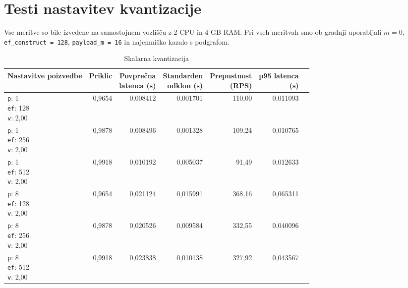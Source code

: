 \clearpage

\section{Testi nastavitev kvantizacije}

Vse meritve so bile izvedene na samostojnem vozlišču z 2 CPU in 4 GB RAM. Pri vseh meritvah smo ob gradnji uporabljali $m = 0$, \texttt{ef\_construct = 128}, \texttt{payload\_m = 16} in najemniško kazalo s podgrafom.

\begin{table}[htbp]
  \centering
\small
  \caption{Skalarna kvantizacija}
  \label{tab:single-2cpu-4ram:sq-2:qdrant-dipl-baseline-tenant-subgraph-sq-m16-ef-128-random-768-100-tenants-extended-upload-2026-08-18-08-20-34.json}
  \begin{tabularx}{\textwidth}{Xrrrrrr}
    \toprule
    Nastavitve poizvedbe & Priklic & \makecell{Povprečna\\latenca (s)} & \makecell{Standarden\\odklon (s)} & \makecell{Prepustnost\\(RPS)} & \makecell{p95 latenca\\(s)}  \\
    \midrule
    \makecell{\texttt{p}: 1\\\texttt{ef}: 128\\\texttt{v}: 2,00} & 0,9654 & 0,008412 & 0,001701 & 110,00 & 0,011093 \\
    \makecell{\texttt{p}: 1\\\texttt{ef}: 256\\\texttt{v}: 2,00} & 0,9878 & 0,008496 & 0,001328 & 109,24 & 0,010765 \\
    \makecell{\texttt{p}: 1\\\texttt{ef}: 512\\\texttt{v}: 2,00} & 0,9918 & 0,010192 & 0,005037 & 91,49 & 0,012633 \\
    \makecell{\texttt{p}: 8\\\texttt{ef}: 128\\\texttt{v}: 2,00} & 0,9654 & 0,021124 & 0,015991 & 368,16 & 0,065311 \\
    \makecell{\texttt{p}: 8\\\texttt{ef}: 256\\\texttt{v}: 2,00} & 0,9878 & 0,020526 & 0,009584 & 332,55 & 0,040096 \\
    \makecell{\texttt{p}: 8\\\texttt{ef}: 512\\\texttt{v}: 2,00} & 0,9918 & 0,023838 & 0,010138 & 327,92 & 0,043567 \\

\end{tabularx}
\end{table}

